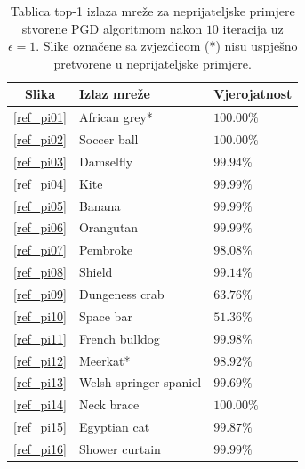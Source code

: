 \documentclass[utf8, diplomski]{fer}
\begin{document}
\begin{table}[H]
\centering
\begin{tabular}{@{}cll@{}}
\toprule
Slika & Izlaz mreže & Vjerojatnost \\ \midrule
\ref{ref_pi01} & African grey* & $100.00\%$\\
\ref{ref_pi02} & Soccer ball & $100.00\%$ \\ 
\ref{ref_pi03} & Damselfly & $99.94\%$ \\ 
\ref{ref_pi04} & Kite & $99.99\%$ \\  
\ref{ref_pi05} & Banana & $99.99\%$ \\ 
\ref{ref_pi06} & Orangutan & $99.99\%$ \\ 
\ref{ref_pi07} & Pembroke & $98.08\%$ \\ 
\ref{ref_pi08} & Shield & $99.14\%$ \\ 
\ref{ref_pi09} & Dungeness crab & $63.76\%$ \\ 
\ref{ref_pi10} & Space bar & $51.36\%$ \\ 
\ref{ref_pi11} & French bulldog & $99.98\%$ \\ 
\ref{ref_pi12} & Meerkat* & $98.92\%$ \\ 
\ref{ref_pi13} & Welsh springer spaniel & $99.69\%$ \\ 
\ref{ref_pi14} & Neck brace & $100.00\%$ \\ 
\ref{ref_pi15} & Egyptian cat & $99.87\%$ \\ 
\ref{ref_pi16} & Shower curtain & $99.99\%$ \\ \bottomrule
\end{tabular}
\caption{Tablica top-1 izlaza mreže za neprijateljske primjere stvorene PGD algoritmom nakon $10$ iteracija uz $\epsilon = 1$. Slike označene sa zvjezdicom (*) nisu uspješno pretvorene u neprijateljske primjere.}\label{pgd_predictions}
\end{table}
\end{document}
